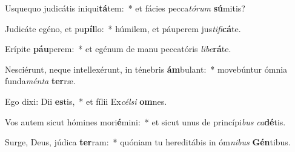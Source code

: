 \item Usquequo judicátis iniqui\textbf{tá}tem:~* et fácies pecca\textit{tó}\textit{rum} \textbf{sú}mitis?
\item Judicáte egéno, et pu\textbf{píl}lo:~* húmilem, et páuperem jus\textit{ti}\textit{fi}\textbf{cá}te.
\item Erípite \textbf{páu}perem:~* et egénum de manu peccatóris \textit{li}\textit{be}\textbf{rá}te.
\item Nesciérunt, neque intellexérunt, in ténebris \textbf{ám}bulant:~* movebúntur ómnia funda\textit{mén}\textit{ta} \textbf{ter}ræ.
\item Ego dixi: Dii \textbf{es}tis,~* et fílii Ex\textit{cél}\textit{si} \textbf{om}nes.
\item Vos autem sicut hómines mori\textbf{é}mini:~* et sicut unus de princípi\textit{bus} \textit{ca}\textbf{dé}tis.
\item Surge, Deus, júdica \textbf{ter}ram:~* quóniam tu hereditábis in óm\textit{ni}\textit{bus} \textbf{Gén}tibus.
